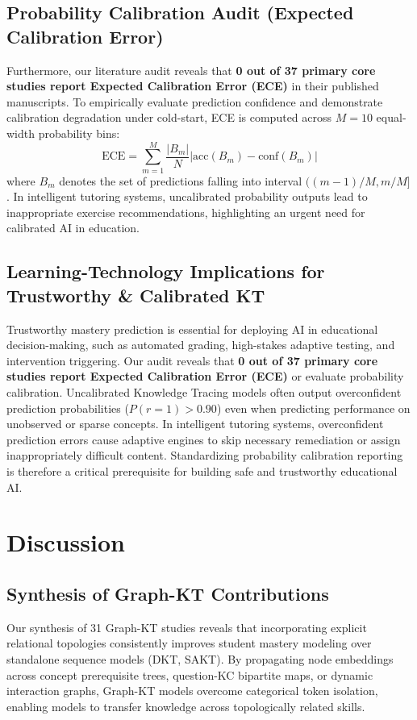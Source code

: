 \documentclass[journal]{IEEEtran}
\begin{document}
\subsection{Probability Calibration Audit (Expected Calibration Error)}
Furthermore, our literature audit reveals that \textbf{0 out of 37 primary core studies report Expected Calibration Error (ECE)} in their published manuscripts. To empirically evaluate prediction confidence and demonstrate calibration degradation under cold-start, ECE is computed across $M=10$ equal-width probability bins:
\begin{equation}
\text{ECE} = \sum_{m=1}^{M} \frac{|B_m|}{N} \left| \text{acc}(B_m) - \text{conf}(B_m) \right|
\end{equation}
where $B_m$ denotes the set of predictions falling into interval $((m-1)/M, m/M]$. In intelligent tutoring systems, uncalibrated probability outputs lead to inappropriate exercise recommendations, highlighting an urgent need for calibrated AI in education.

\subsection{Learning-Technology Implications for Trustworthy \& Calibrated KT}
Trustworthy mastery prediction is essential for deploying AI in educational decision-making, such as automated grading, high-stakes adaptive testing, and intervention triggering. Our audit reveals that \textbf{0 out of 37 primary core studies report Expected Calibration Error (ECE)} or evaluate probability calibration. Uncalibrated Knowledge Tracing models often output overconfident prediction probabilities ($P(r=1) > 0.90$) even when predicting performance on unobserved or sparse concepts. In intelligent tutoring systems, overconfident prediction errors cause adaptive engines to skip necessary remediation or assign inappropriately difficult content. Standardizing probability calibration reporting is therefore a critical prerequisite for building safe and trustworthy educational AI.

\section{Discussion}
\label{sec:discussion}

\subsection{Synthesis of Graph-KT Contributions}
Our synthesis of 31 Graph-KT studies reveals that incorporating explicit relational topologies consistently improves student mastery modeling over standalone sequence models (DKT, SAKT). By propagating node embeddings across concept prerequisite trees, question-KC bipartite maps, or dynamic interaction graphs, Graph-KT models overcome categorical token isolation, enabling models to transfer knowledge across topologically related skills.
\end{document}
